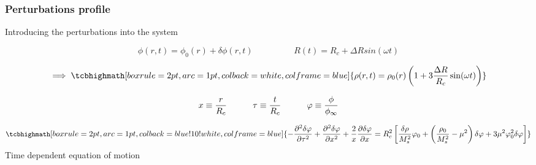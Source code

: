 \documentclass[10pt,t,handout]{beamer}
\begin{document}
\begin{frame}
\frametitle{Perturbations profile}
   \centering Introducing the perturbations into the system

    \begin{equation*}
        \phi(r,t) = \phi_0(r) + \delta\phi(r,t) \hspace{2cm} R(t) = R_c + \Delta R sin(\omega t)
    \end{equation*}
    
    \begin{equation*}
       \implies \tcbhighmath[boxrule=2pt,arc=1pt,colback=white,colframe=blue]{\rho(r,t) = \rho_0(r)\left(1 + 3\frac{\Delta R}{R_c} \sin(\omega t)\right)}
    \end{equation*}
    
    \begin{equation*}
        x \equiv \frac{r}{R_c}\, \hspace{10mm}    \tau \equiv \frac{t}{R_c}\, \hspace{10mm} \varphi \equiv \frac{\phi}{\phi_{\infty}}
    \end{equation*}
    
    
    
    \begin{equation*}
       \small \tcbhighmath[boxrule=2pt,arc=1pt,colback=blue!10!white,colframe=blue]{-\frac{\partial^2\delta\varphi}{\partial\tau^2}+\frac{\partial^2\delta\varphi}{\partial x^2}+\frac{2}{x}\frac{\partial\delta\varphi}{\partial x} =
       R_c^2\left[\frac{\delta\rho}{M_{s}^2}\varphi_0+\left(\frac{\rho_0}{M_{s}^2}-\mu^2 \right)\delta\varphi+3\mu^2\varphi_0^2\delta\varphi\right]}
    \end{equation*}
    \centering Time dependent equation of motion
\end{frame}
\end{document}
